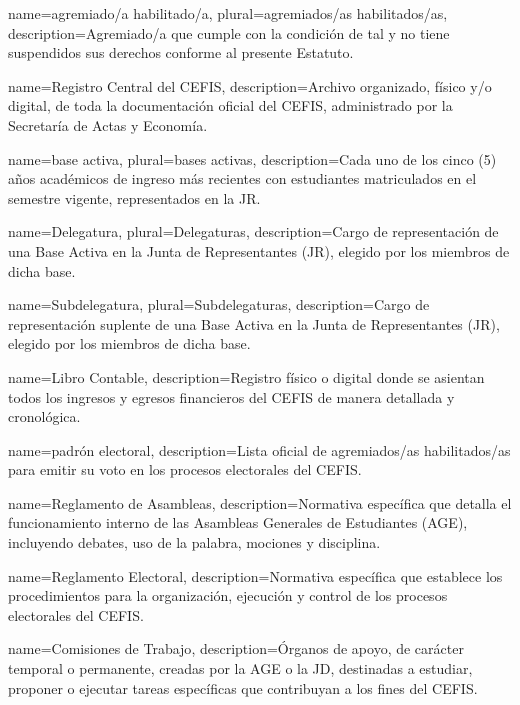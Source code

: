 {
  name={agremiado/a habilitado/a},
  plural={agremiados/as habilitados/as},
  description={Agremiado/a que cumple con la condición de tal y no tiene suspendidos sus derechos conforme al presente Estatuto.}
}

{
  name={Registro Central del CEFIS},
  description={Archivo organizado, físico y/o digital, de toda la documentación oficial del CEFIS, administrado por la Secretaría de Actas y Economía.}
}

{
  name={base activa},
  plural={bases activas},
  description={Cada uno de los cinco (5) años académicos de ingreso más recientes con estudiantes matriculados en el semestre vigente, representados en la JR.}
}

{
  name={Delegatura},
  plural={Delegaturas},
  description={Cargo de representación de una Base Activa en la Junta de Representantes (JR), elegido por los miembros de dicha base.}
}

{
  name={Subdelegatura},
  plural={Subdelegaturas},
  description={Cargo de representación suplente de una Base Activa en la Junta de Representantes (JR), elegido por los miembros de dicha base.}
}

{
  name={Libro Contable},
  description={Registro físico o digital donde se asientan todos los ingresos y egresos financieros del CEFIS de manera detallada y cronológica.}
}

{
  name={padrón electoral},
  description={Lista oficial de agremiados/as habilitados/as para emitir su voto en los procesos electorales del CEFIS.}
}

{
  name={Reglamento de Asambleas},
  description={Normativa específica que detalla el funcionamiento interno de las Asambleas Generales de Estudiantes (AGE), incluyendo debates, uso de la palabra, mociones y disciplina.}
}

{
  name={Reglamento Electoral},
  description={Normativa específica que establece los procedimientos para la organización, ejecución y control de los procesos electorales del CEFIS.}
}

{
  name={Comisiones de Trabajo},
  description={Órganos de apoyo, de carácter temporal o permanente, creadas por la AGE o la JD, destinadas a estudiar, proponer o ejecutar tareas específicas que contribuyan a los fines del CEFIS.}
}

